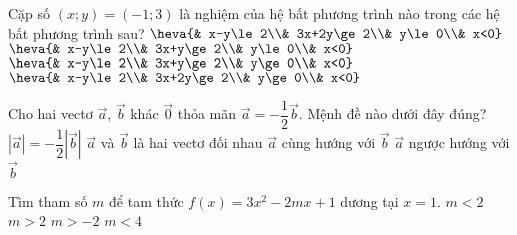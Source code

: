 \begin{ex}%
Cặp số $(x;y)=(-1;3)$ là nghiệm của hệ bất phương trình nào trong các hệ bất phương trình sau?
\def\dotEX{}
\choice
{$\heva{& x-y\le 2\\& 3x+2y\ge 2\\& y\le 0\\& x<0}$}
{$\heva{& x-y\le 2\\& 3x+y\ge 2\\& y\le 0\\& x<0}$}
{$\heva{& x-y\le 2\\& 3x+y\ge 2\\& y\ge 0\\& x<0}$}
{\True $\heva{& x-y\le 2\\& 3x+2y\ge 2\\& y\ge 0\\& x<0}
$}
\end{ex}

\begin{ex}%
Cho hai vectơ $\overrightarrow{a}$, $\overrightarrow{b}$ khác $\overrightarrow{0}$ thỏa mãn $\overrightarrow{a}=-\dfrac{1}{2}\overrightarrow{b}$. Mệnh đề nào dưới đây đúng?
\choice
{$\left|\overrightarrow{a}\right|=-\dfrac{1}{2}\left|\overrightarrow{b}\right|$}
{$\overrightarrow{a}$ và $\overrightarrow{b}$ là hai vectơ đối nhau}
{$\overrightarrow{a}$ cùng hướng với $\overrightarrow{b}$}
{\True $\overrightarrow{a}$ ngược hướng với $\overrightarrow{b}$}
\end{ex}

\begin{ex}%
Tìm tham số $m$ để tam thức $f(x)=3x^2-2mx+1$ dương tại $x=1$.
\choice
{\True $m<2$}
{$m>2$}
{$m>-2$}
{$m<4$}
\end{ex}

